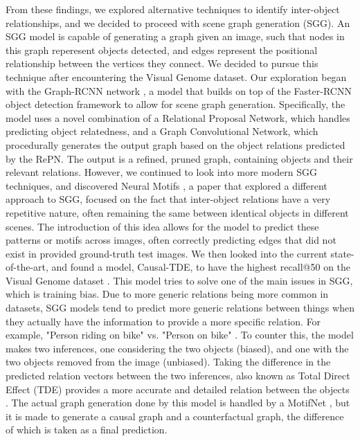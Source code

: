 \documentclass[letterpaper, 10 pt, conference]{ieeeconf}  %
\begin{document}
    From these findings, we explored alternative techniques to identify inter-object relationships, and we decided to proceed with scene graph generation (SGG). An SGG model is capable of generating a graph given an image, such that nodes in this graph reperesent objects detected, and edges represent the positional relationship between the vertices they connect. We decided to pursue this technique after encountering the Visual Genome dataset. Our exploration began with the Graph-RCNN network \cite{yang2018graph}, a model that builds on top of the Faster-RCNN object detection framework to allow for scene graph generation. Specifically, the model uses a novel combination of a Relational Proposal Network, which handles predicting object relatedness, and a Graph Convolutional Network, which procedurally generates the output graph based on the object relations predicted by the RePN. The output is a refined, pruned graph, containing objects and their relevant relations. However, we continued to look into more modern SGG techniques, and discovered Neural Motifs \cite{zellers2018scenegraphs}, a paper that explored a different approach to SGG, focused on the fact that inter-object relations have a very repetitive nature, often remaining the same between identical objects in different scenes. The introduction of this idea allows for the model to predict these patterns or motifs across images, often correctly predicting edges that did not exist in provided ground-truth test images. We then looked into the current state-of-the-art, and found a model, Causal-TDE, to have the highest recall@50 on the Visual Genome dataset \cite{latestinML}. This model tries to solve one of the main issues in SGG, which is training bias. Due to more generic relations being more common in datasets, SGG models tend to predict more generic relations between things when they actually have the information to provide a more specific relation. For example, "Person riding on bike" vs. "Person on bike" \cite{tang2020unbiased}. To counter this, the model makes two inferences, one considering the two objects (biased), and one with the two objects removed from the image (unbiased). Taking the difference in the predicted relation vectors between the two inferences, also known as Total Direct Effect (TDE) provides a more accurate and detailed relation between the objects \cite{tang2020unbiased}. The actual graph generation done by this model is handled by a MotifNet \cite{zellers2018scenegraphs}, but it is made to generate a causal graph and a counterfactual graph, the difference of which is taken as a final prediction. 
\end{document}

